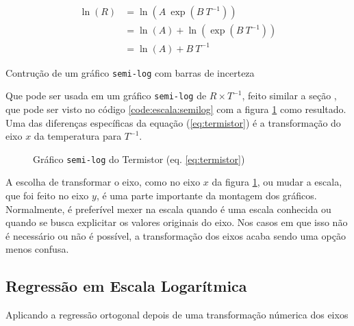    \begin{align*}
        \ln(R)
            &= \ln\left(A ~ \exp\left(B ~ T^{-1}\right) \right) \\
            &= \ln(A) + \ln\left(\exp\left(B ~ T^{-1}\right) \right) \\
            &= \ln(A) + B ~ T^{-1}
    \end{align*}

    \begin{listing}[H]
        \caption{Contrução de um gráfico \texttt{semi-log} com barras de incerteza}
        \label{code:escala:semilog}

    \end{listing}

    Que pode ser usada em um gráfico \texttt{semi-log} de $R \times T^{-1}$, feito similar a seção , que pode ser visto no código \ref{code:escala:semilog} com a figura \ref{fig:escala:semilog:resultado} como resultado. Uma das diferenças específicas da equação (\ref{eq:termistor}) é a transformação do eixo $x$ da temperatura para $T^{-1}$.

    \begin{figure}[H]
        \centering
        

        \caption{Gráfico \texttt{semi-log} do Termistor (eq. \ref{eq:termistor})}
        \label{fig:escala:semilog:resultado}
    \end{figure}

    \begin{nota}
        A escolha de transformar o eixo, como no eixo $x$ da figura \ref{fig:escala:semilog:resultado}, ou mudar a escala, que foi feito no eixo $y$, é uma parte importante da montagem dos gráficos. Normalmente, é preferível mexer na escala quando é uma escala conhecida ou quando se busca explicitar os valores originais do eixo. Nos casos em que isso não é necessário ou não é possível, a transformação dos eixos acaba sendo uma opção menos confusa.
    \end{nota}


\subsection{Regressão em Escala Logarítmica} \label{sec:escala:regres}

    \begin{listing}[H]
        \caption{Aplicando a regressão ortogonal depois de uma transformação númerica dos eixos}
        \label{code:escala:regres}

    \end{listing}

